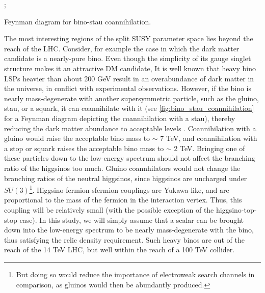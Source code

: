 \begin{marginfigure}
  ;
\caption{Feynman diagram for bino-stau coannihilation.}
\label{fig:bino_stau_coannihilation}
\end{marginfigure}

The most interesting regions of the split SUSY parameter space lies beyond the reach of the LHC. Consider, for example the case in which the dark matter candidate is a nearly-pure bino. Even though the simplicity of its gauge singlet structure makes it an attractive DM candidate, It is well known that heavy bino LSPs heavier than about 200 GeV result in an overabundance of dark matter in the universe, in conflict with experimental observations. However, if the bino is nearly mass-degenerate with another supersymmetric particle, such as the gluino, stau, or a squark, it can coannihilate with it (see \autoref{fig:bino_stau_coannihilation} for a Feynman diagram depicting the coannihilation with a stau), thereby reducing the dark matter abundance to acceptable levels \cite{Griest:1990kh}. Coannihilation with a gluino would raise the acceptable bino mass to $\sim$ 7 TeV, and coannihilation with a stop or squark raises the acceptable bino mass to $\sim$ 2 TeV. Bringing one of these particles down to the low-energy spectrum should not affect the branching ratio of the higgsinos too much. Gluino coannhilators would not change the branching ratios of the neutral higgsinos, since higgsinos are uncharged under $SU(3)$\footnote{But doing so would reduce the importance of electroweak search channels in comparison, as gluinos would then be abundantly produced.}. Higgsino-fermion-sfermion couplings are Yukawa-like, and are proportional to the mass of the fermion in the interaction vertex. Thus, this coupling will be relatively small (with the possible exception of the higgsino-top-stop case). In this study, we will simply assume that a scalar can be brought down into the low-energy spectrum to be nearly mass-degenerate with the bino, thus satisfying the relic density requirement. Such heavy binos are out of the reach of the 14 TeV LHC, but well within the reach of a 100 TeV collider.


